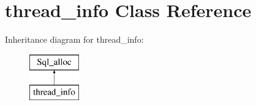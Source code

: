 \hypertarget{classthread__info}{}\section{thread\+\_\+info Class Reference}
\label{classthread__info}
Inheritance diagram for thread\+\_\+info\+:\begin{figure}[H]
\begin{center}
\leavevmode
\includegraphics[height=2.000000cm]{classthread__info}
\end{center}
\end{figure}
